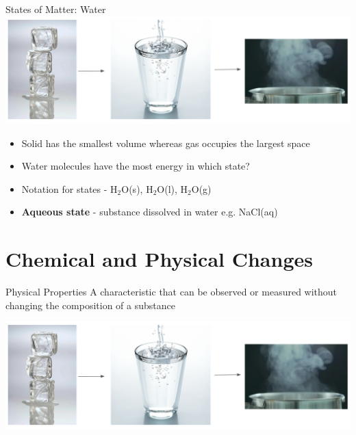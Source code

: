 \documentclass[11pt]{beamer}
\begin{document}
\begin{frame}{States of Matter: Water}
  \centering
  \includegraphics[width=\linewidth]{water_states}
  \vspace{-0.2in}
  \begin{itemize}
  \item Solid has the smallest volume whereas gas occupies
    the largest space
  \item Water molecules have the most energy in which state?
  \item Notation for states - H$_2$O(s), H$_2$O(l), H$_2$O(g)
  \item \textbf{Aqueous state} - substance dissolved in water
    e.g. NaCl(aq)
  \end{itemize}
\end{frame}

\section{Chemical and Physical Changes}

\begin{frame}{Physical Properties}
  A characteristic that can be observed or measured without
  changing the composition of a substance
  
  \centering
  \includegraphics[width=\linewidth]{water_states}
\end{frame}
\end{document}
